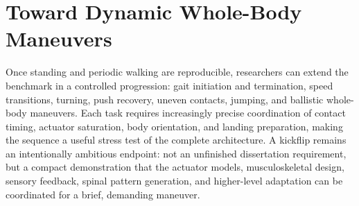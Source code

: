 \section{Toward Dynamic Whole-Body Maneuvers}\label{sec:fw_kickflip}

\begin{reviewchange}
Once standing and periodic walking are reproducible, researchers can extend the benchmark in a controlled progression: gait initiation and termination, speed transitions, turning, push recovery, uneven contacts, jumping, and ballistic whole-body maneuvers. Each task requires increasingly precise coordination of contact timing, actuator saturation, body orientation, and landing preparation, making the sequence a useful stress test of the complete architecture. A kickflip remains an intentionally ambitious endpoint: not an unfinished dissertation requirement, but a compact demonstration that the actuator models, musculoskeletal design, sensory feedback, spinal pattern generation, and higher-level adaptation can be coordinated for a brief, demanding maneuver.
\end{reviewchange}
